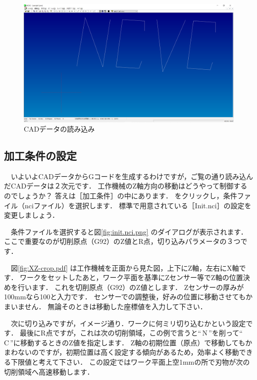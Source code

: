 \begin{figure}[H]
\centering
\includegraphics[scale=0.4]{No2/fig/NCVCread.png}
\caption{CADデータの読み込み}
\label{fig:NCVCread.png}
\end{figure}

\subsection{加工条件の設定}

　いよいよCADデータからGコードを生成するわけですが，ご覧の通り読み込んだCADデータは２次元です．
工作機械のZ軸方向の移動はどうやって制御するのでしょうか？
答えは［加工条件］の中にあります．
 をクリックし，条件ファイル（nciファイル）を選択します．
標準で用意されている［Init.nci］の設定を変更しましょう．

　条件ファイルを選択すると図\ref{fig:init.nci.png} のダイアログが表示されます．
ここで重要なのが切削原点（G92）のZ値とR点，切り込みパラメータの３つです．

　図\ref{fig:XZ-crop.pdf} は工作機械を正面から見た図，上下にZ軸，左右にX軸です．
ワークをセットしたあと，ワーク平面を基準にZセンサー等でZ軸の位置決めを行います．
これを切削原点（G92）のZ値とします．
Zセンサーの厚みが100mmなら100と入力です．
センサーでの調整後，好みの位置に移動させてもかまいません．
無論そのときは移動した座標値を入力して下さい．

　次に切り込みですが，イメージ通り．ワークに何ミリ切り込むかという設定です．
最後にR点ですが，これは次の切削領域，この例で言うと``\,N\,''を削って``\,C\,''に移動するときのZ値を指定します．
Z軸の初期位置（原点）で移動してもかまわないのですが，初期位置は高く設定する傾向があるため，効率よく移動できる下限値と考えて下さい．
この設定ではワーク平面上空1mmの所で刃物が次の切削領域へ高速移動します．

